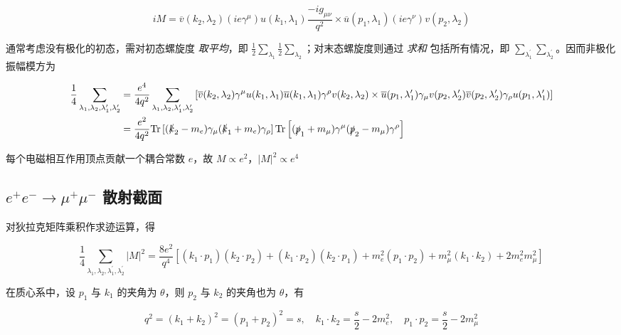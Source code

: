 \begin{equation}
    iM = \overline{v}(k_2, \lambda_2) (ie\gamma^\mu) u(k_1, \lambda_1) \frac{-i g_{\mu\nu}}{q^2} \times \overline{u}(p_1, \lambda_1) (ie\gamma^\nu) v(p_2, \lambda_2)
\end{equation}

通常考虑没有极化的初态，需对初态螺旋度 \emph{取平均}，即 $\frac{1}{2}\sum_{\lambda_1}\frac{1}{2}\sum_{\lambda_2}$；对末态螺旋度则通过 \emph{求和} 包括所有情况，即 $\sum_{\lambda_1^\prime} \sum_{\lambda_2^\prime}$。因而非极化振幅模方为

\begin{align}
    \frac{1}{4} \sum_{\lambda_1, \lambda_2, \lambda_1^\prime, \lambda_2^\prime} &= \frac{e^4}{4 q^2} \sum_{\lambda_1, \lambda_2, \lambda_1^\prime, \lambda_2^\prime} \left[\overline{v}(k_2, \lambda_2) \gamma^\mu u(k_1, \lambda_1) \overline{u}(k_1, \lambda_1) \gamma^\rho v(k_2, \lambda_2) \times \overline{u}(p_1, \lambda_1^\prime) \gamma_\mu v(p_2, \lambda_2^\prime) \overline{v}(p_2, \lambda_2^\prime) \gamma_\rho u(p_1, \lambda_1^\prime)\right] \\
    &= \frac{e^2}{4 q^2} \mathrm{Tr}\left[(\slashed{k}_2-m_e)\gamma_\mu(\slashed{k}_1+m_e)\gamma_\rho\right] \mathrm{Tr}\left[(\slashed{p}_1+m_\mu)\gamma^\mu(\slashed{p}_2-m_\mu)\gamma^\rho\right]
\end{align}

每个电磁相互作用顶点贡献一个耦合常数 $e$，故 $M \propto e^2$，$|M|^2 \propto e^4$

\subsection{\texorpdfstring{$e^+ e^- \to \mu^+ \mu^-$}{e+e- -> mu+mu-} 散射截面}

对狄拉克矩阵乘积作求迹运算，得

\begin{equation}
    \frac{1}{4} \sum_{\lambda_1, \lambda_2, \lambda_1^\prime, \lambda_2^\prime} |M|^2 = \frac{8 e^2}{q^4} \left[(k_1 \cdot p_1)(k_2 \cdot p_2) + (k_1 \cdot p_2)(k_2 \cdot p_1) + m_e^2 (p_1 \cdot p_2) + m_\mu^2 (k_1 \cdot k_2) + 2 m_e^2 m_\mu^2\right]
\end{equation}

在质心系中，设 $p_1$ 与 $k_1$ 的夹角为 $\theta$，则 $p_2$ 与 $k_2$ 的夹角也为 $\theta$，有

\begin{equation}
    q^2 = (k_1 + k_2)^2 = (p_1 + p_2)^2 = s, \quad k_1 \cdot k_2 = \frac{s}{2} - 2 m_e^2, \quad p_1 \cdot p_2 = \frac{s}{2} - 2 m_\mu^2
\end{equation}

